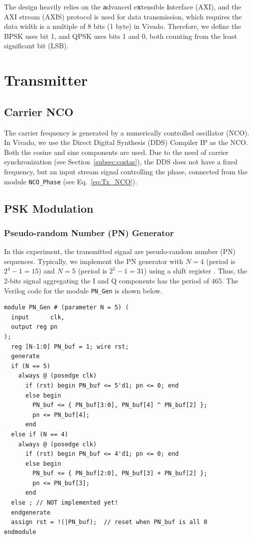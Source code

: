 \documentclass[journal,twoside]{IEEEtran}
\begin{document}
      The design heavily relies on the \textbf{a}dvanced e\textbf{x}tensible \textbf{i}nterface (AXI),
      and the AXI stream (AXIS) protocol is used for data transmission,
      which requires the data width is a multiple of 8 bits (1 byte) in Vivado.
      Therefore, we define the BPSK uses bit 1, and QPSK uses bits 1 and 0,
      both counting from the least significant bit (LSB).

    \section{Transmitter}

    \subsection{Carrier NCO}

      The carrier frequency is generated by a numerically controlled oscillator (NCO).
      In Vivado, we use the Direct Digital Synthesis (DDS) Compiler IP \cite{xilinx:pg141} as the NCO.
      Both the cosine and sine components are used.
      Due to the need of carrier synchronization (see Section~\ref{subsec:costas}),
      the DDS does not have a fixed frequency,
      but an input stream signal controlling the phase,
      connected from the module \texttt{NCO\_Phase} (see Eq.~\eqref{eq:Tx_NCO}).

  \subsection{PSK Modulation}

    \subsubsection{Pseudo-random Number (PN) Generator}

      In this experiment, the transmitted signal are pseudo-random number (PN) sequences.
      Typically, we implement the PN generator with $N=4$ (period is $2^4-1=15$) and $N=5$ (period is $2^5-1=31$)
      using a shift register \cite{james1990review}.
      Thus, the 2-bits signal aggregating the I and Q components has the period of $465$.
      The Verilog code for the module \texttt{PN\_Gen} is shown below.
      \begin{verbatim}
module PN_Gen # (parameter N = 5) (
  input      clk,
  output reg pn
);
  reg [N-1:0] PN_buf = 1; wire rst;
  generate
  if (N == 5)
    always @ (posedge clk)
      if (rst) begin PN_buf <= 5'd1; pn <= 0; end
      else begin
        PN_buf <= { PN_buf[3:0], PN_buf[4] ^ PN_buf[2] };
        pn <= PN_buf[4];
      end
  else if (N == 4)
    always @ (posedge clk)
      if (rst) begin PN_buf <= 4'd1; pn <= 0; end
      else begin
        PN_buf <= { PN_buf[2:0], PN_buf[3] + PN_buf[2] };
        pn <= PN_buf[3];
      end
  else ; // NOT implemented yet!
  endgenerate
  assign rst = !(|PN_buf);  // reset when PN_buf is all 0
endmodule
      \end{verbatim}
\end{document}
